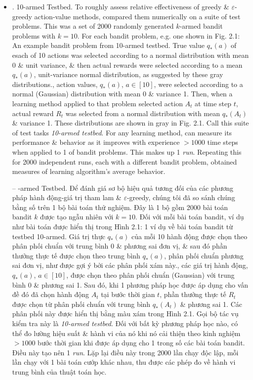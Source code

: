 \documentclass{article}
\newtheorem{problem}{Problem}
\begin{document}
\begin{itemize}
\begin{itemize}
\begin{problem}
            -- Trong lựa chọn hành động tham lam $\varepsilon$, đối với trường hợp 2 hành động \& $\varepsilon = 0,5$, xác suất hành động tham lam được chọn là bao nhiêu?
        \end{problem}
        \item {. 10-armed Testbed.} To roughly assess relative effectiveness of greedy \& $\varepsilon$-greedy action-value methods, compared them numerically on a suite of test problems. This was a set of 2000 randomly generated $k$-armed bandit problems with $k = 10$. For each bandit problem, e.g. one shown in {\sf Fig. 2.1: An example bandit problem from 10-armed testbed. True value $q_*(a)$ of esach of 10 actions was selected according to a normal distribution with mean 0 \& unit variance, \& then actual rewards were selected according to a mean $q_*(a)$, unit-variance normal distribution, as suggested by these gray distributions.}, action values, $q_*(a)$, $a\in[10]$, were selected according to a normal (Gaussian) distribution with mean 0 \& variance 1. Then, when a learning method applied to that problem selected action $A_t$ at time step $t$, actual reward $R_t$ was selected from a normal distribution with mean $q_*(A_t)$ \& variance 1. These distributions are shown in gray in Fig. 2.1. Call this suite of test tasks {\it10-armed testbed}. For any learning method, can measure its performance \& behavior as it improves with experience $> 1000$ time steps when applied to 1 of bandit problems. This makes up 1 {\it run}. Repeating this for 2000 independent runs, each with a different bandit problem, obtained measures of learning algorithm's average behavior.

        -- {-armed Testbed.} Để đánh giá sơ bộ hiệu quả tương đối của các phương pháp hành động-giá trị tham lam \& $\varepsilon$-greedy, chúng tôi đã so sánh chúng bằng số trên 1 bộ bài toán thử nghiệm. Đây là 1 bộ gồm 2000 bài toán bandit $k$ được tạo ngẫu nhiên với $k = 10$. Đối với mỗi bài toán bandit, ví dụ như bài toán được hiển thị trong {\sf Hình 2.1: 1 ví dụ về bài toán bandit từ testbed 10-armed. Giá trị thực $q_*(a)$ của mỗi 10 hành động được chọn theo phân phối chuẩn với trung bình 0 \& phương sai đơn vị, \& sau đó phần thưởng thực tế được chọn theo trung bình $q_*(a)$, phân phối chuẩn phương sai đơn vị, như được gợi ý bởi các phân phối xám này.}, các giá trị hành động, $q_*(a)$, $a\in[10]$, được chọn theo phân phối chuẩn (Gaussian) với trung bình 0 \& phương sai 1. Sau đó, khi 1 phương pháp học được áp dụng cho vấn đề đó đã chọn hành động $A_t$ tại bước thời gian $t$, phần thưởng thực tế $R_t$ được chọn từ phân phối chuẩn với trung bình $q_*(A_t)$ \& phương sai 1. Các phân phối này được hiển thị bằng màu xám trong Hình 2.1. Gọi bộ tác vụ kiểm tra này là {\it10-armed testbed}. Đối với bất kỳ phương pháp học nào, có thể đo lường hiệu suất \& hành vi của nó khi nó cải thiện theo kinh nghiệm $> 1000$ bước thời gian khi được áp dụng cho 1 trong số các bài toán bandit. Điều này tạo nên 1 {\it run}. Lặp lại điều này trong 2000 lần chạy độc lập, mỗi lần chạy với 1 bài toán cướp khác nhau, thu được các phép đo về hành vi trung bình của thuật toán học.


\end{itemize}
\end{itemize}
\end{document}
